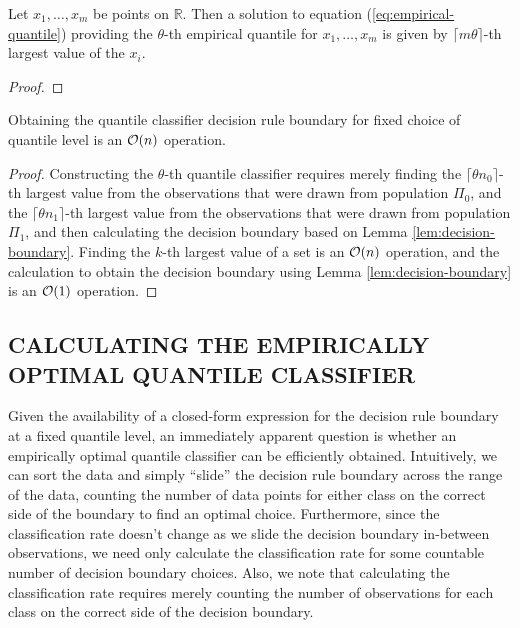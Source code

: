 \begin{lemma}
  \label{lem:empirical-quantlev}
  Let $x_1, \dots, x_m$ be points on $\mathbb{R}$.  Then a solution to equation
  (\ref{eq:empirical-quantile}) providing the $\theta$-th empirical quantile for
  $x_1, \dots, x_m$ is given by $\lceil m \theta \rceil$-th largest value of the
  $x_i$.
\end{lemma}

\begin{proof}
  
\end{proof}

\begin{lemma}
  \label{lem:decision-rule-time}
  Obtaining the quantile classifier decision rule boundary for fixed choice of
  quantile level is an $\mathcal{O}(n)$ operation.
\end{lemma}

\begin{proof}
  Constructing the $\theta$-th quantile classifier requires merely finding the
  $\lceil \theta n_0 \rceil$-th largest value from the observations that were
  drawn from population $\Pi_0$, and the $\lceil \theta n_1 \rceil$-th largest
  value from the observations that were drawn from population $\Pi_1$, and then
  calculating the decision boundary based on Lemma \ref{lem:decision-boundary}.
  Finding the $k$-th largest value of a set is an $\mathcal{O}(n)$ operation, and the
  calculation to obtain the decision boundary using Lemma
  \ref{lem:decision-boundary} is an $\mathcal{O}(1)$ operation.
\end{proof}




\subsection{CALCULATING THE EMPIRICALLY OPTIMAL QUANTILE CLASSIFIER}
\label{sec:empirically-optimal-algo}

Given the availability of a closed-form expression for the decision rule
boundary at a fixed quantile level, an immediately apparent question is whether
an empirically optimal quantile classifier can be efficiently obtained.
Intuitively, we can sort the data and simply ``slide'' the decision rule
boundary across the range of the data, counting the number of data points for
either class on the correct side of the boundary to find an optimal choice.
Furthermore, since the classification rate doesn't change as we slide the
decision boundary in-between observations, we need only calculate the
classification rate for some countable number of decision boundary choices.
Also, we note that calculating the classification rate requires merely counting
the number of observations for each class on the correct side of the decision
boundary.

